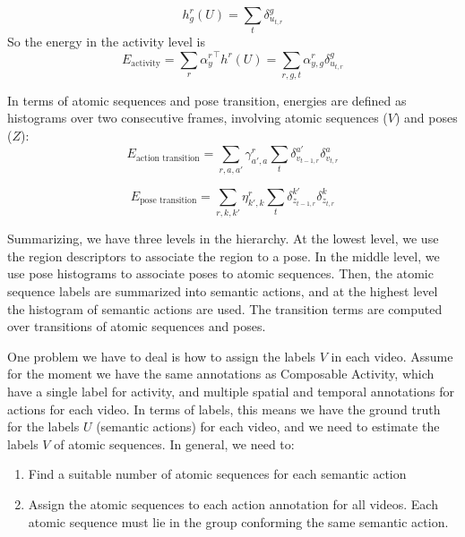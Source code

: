 \documentclass[10pt,letterpaper]{article}
\newcommand{\+}[1]{\ensuremath{{\boldsymbol #1}}}
\begin{document}
\begin{equation}
h_g^{r}(U) = \sum_{t} \delta_{u_{t,r}}^g
\end{equation}
So the energy in the activity level is
\begin{equation}
E_{\text{activity}} = \sum_{r} {\alpha^r_{y}}^\top h^{r}(U) = \sum_{r,g,t}  \alpha^r_{y,g} \delta_{u_{t,r}}^g
\end{equation}

In terms of atomic sequences and pose transition, energies are defined
as histograms over two consecutive frames,
involving atomic sequences ($V$) and poses ($Z$):
\begin{equation}
E_{\text{action transition}} = \sum_{r,a,a'}  \gamma^r_{a',a} \sum_{t} \delta_{v_{t-1,r}}^{a'}\delta_{v_{t,r}}^a 
\end{equation}

\begin{equation}
E_{\text{pose transition}} =\sum_{r,k,k'}  \eta^r_{k',k}\sum_{t}\delta_{z_{t-1,r}}^{k'}\delta_{z_{t,r}}^{k}
\end{equation}

Summarizing, we have three levels in the hierarchy. At the lowest level, we use the region descriptors to associate the region to a pose. In the middle level, we use pose histograms to associate poses to atomic sequences. Then, the atomic sequence labels are summarized into semantic actions, and at the highest level the histogram of semantic actions are used. The transition terms are computed over transitions of atomic sequences and poses. 
 \vspace{1em}

One problem we have to deal is how to assign the labels $V$ in each video. Assume for the moment we have the same annotations as Composable Activity, which have a single label for activity, and multiple spatial and temporal annotations for actions for each video. In terms of labels, this means we have the ground truth for the labels $U$ (semantic actions) for each video, and we need to estimate the labels $V$ of atomic sequences.  In general, we need to:
\begin{enumerate}
\item Find a suitable number of atomic sequences for each semantic action
\item Assign the atomic sequences to each action annotation for all videos. Each atomic sequence must lie in the group conforming the same semantic action.
\end{enumerate}
\end{document}
